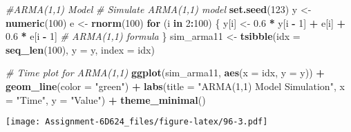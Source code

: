 \documentclass[
]{article}
\newenvironment{Shaded}{\begin{snugshade}}{\end{snugshade}}
\newcommand{\AttributeTok}[1]{\textcolor[rgb]{0.13,0.29,0.53}{#1}}
\newcommand{\CommentTok}[1]{\textcolor[rgb]{0.56,0.35,0.01}{\textit{#1}}}
\newcommand{\ControlFlowTok}[1]{\textcolor[rgb]{0.13,0.29,0.53}{\textbf{#1}}}
\newcommand{\DecValTok}[1]{\textcolor[rgb]{0.00,0.00,0.81}{#1}}
\newcommand{\FloatTok}[1]{\textcolor[rgb]{0.00,0.00,0.81}{#1}}
\newcommand{\FunctionTok}[1]{\textcolor[rgb]{0.13,0.29,0.53}{\textbf{#1}}}
\newcommand{\NormalTok}[1]{#1}
\newcommand{\OtherTok}[1]{\textcolor[rgb]{0.56,0.35,0.01}{#1}}
\newcommand{\SpecialCharTok}[1]{\textcolor[rgb]{0.81,0.36,0.00}{\textbf{#1}}}
\newcommand{\StringTok}[1]{\textcolor[rgb]{0.31,0.60,0.02}{#1}}
\begin{document}
\begin{Shaded}
\begin{Highlighting}[]
\CommentTok{\#ARMA(1,1) Model}
\CommentTok{\# Simulate ARMA(1,1) model}
\FunctionTok{set.seed}\NormalTok{(}\DecValTok{123}\NormalTok{)}
\NormalTok{y }\OtherTok{\textless{}{-}} \FunctionTok{numeric}\NormalTok{(}\DecValTok{100}\NormalTok{)}
\NormalTok{e }\OtherTok{\textless{}{-}} \FunctionTok{rnorm}\NormalTok{(}\DecValTok{100}\NormalTok{)}
\ControlFlowTok{for}\NormalTok{ (i }\ControlFlowTok{in} \DecValTok{2}\SpecialCharTok{:}\DecValTok{100}\NormalTok{) \{}
\NormalTok{  y[i] }\OtherTok{\textless{}{-}} \FloatTok{0.6} \SpecialCharTok{*}\NormalTok{ y[i }\SpecialCharTok{{-}} \DecValTok{1}\NormalTok{] }\SpecialCharTok{+}\NormalTok{ e[i] }\SpecialCharTok{+} \FloatTok{0.6} \SpecialCharTok{*}\NormalTok{ e[i }\SpecialCharTok{{-}} \DecValTok{1}\NormalTok{] }\CommentTok{\# ARMA(1,1) formula}
\NormalTok{\}}
\NormalTok{sim\_arma11 }\OtherTok{\textless{}{-}} \FunctionTok{tsibble}\NormalTok{(}\AttributeTok{idx =} \FunctionTok{seq\_len}\NormalTok{(}\DecValTok{100}\NormalTok{), }\AttributeTok{y =}\NormalTok{ y, }\AttributeTok{index =}\NormalTok{ idx)}

\CommentTok{\# Time plot for ARMA(1,1)}
\FunctionTok{ggplot}\NormalTok{(sim\_arma11, }\FunctionTok{aes}\NormalTok{(}\AttributeTok{x =}\NormalTok{ idx, }\AttributeTok{y =}\NormalTok{ y)) }\SpecialCharTok{+}
  \FunctionTok{geom\_line}\NormalTok{(}\AttributeTok{color =} \StringTok{"green"}\NormalTok{) }\SpecialCharTok{+}
  \FunctionTok{labs}\NormalTok{(}\AttributeTok{title =} \StringTok{"ARMA(1,1) Model Simulation"}\NormalTok{, }\AttributeTok{x =} \StringTok{"Time"}\NormalTok{, }\AttributeTok{y =} \StringTok{"Value"}\NormalTok{) }\SpecialCharTok{+}
  \FunctionTok{theme\_minimal}\NormalTok{()}
\end{Highlighting}
\end{Shaded}

\texttt{[image: Assignment-6D624\_files/figure-latex/96-3.pdf]}
\end{document}
